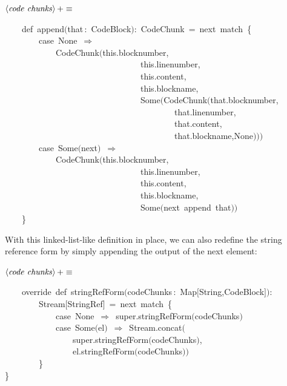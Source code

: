 \documentclass[a4paper,12pt]{article}
\begin{document}
$\left<\mbox{\emph{code chunks}}\right>+\equiv$
\begin{program}~~~~{\vem def}~append$($that\,{\rm :}~CodeBlock$)${\rm :}~CodeChunk~=~next~{\vem match}~{\small\{}
\\~~~~~~~~{\vem case}~None~$\Rightarrow$
\\~~~~~~~~~~~~CodeChunk$(${\vem this}.blocknumber,
\\~~~~~~~~~~~~~~~~~~~~~~~~~~~~~~~~{\vem this}.linenumber,
\\~~~~~~~~~~~~~~~~~~~~~~~~~~~~~~~~{\vem this}.content,
\\~~~~~~~~~~~~~~~~~~~~~~~~~~~~~~~~{\vem this}.blockname,
\\~~~~~~~~~~~~~~~~~~~~~~~~~~~~~~~~Some$($CodeChunk$($that.blocknumber,
\\~~~~~~~~~~~~~~~~~~~~~~~~~~~~~~~~~~~~~~~~that.linenumber,
\\~~~~~~~~~~~~~~~~~~~~~~~~~~~~~~~~~~~~~~~~that.content,
\\~~~~~~~~~~~~~~~~~~~~~~~~~~~~~~~~~~~~~~~~that.blockname,None$)$$)$$)$
\\~~~~~~~~{\vem case}~Some$($next$)$~$\Rightarrow$
\\~~~~~~~~~~~~CodeChunk$(${\vem this}.blocknumber,
\\~~~~~~~~~~~~~~~~~~~~~~~~~~~~~~~~{\vem this}.linenumber,
\\~~~~~~~~~~~~~~~~~~~~~~~~~~~~~~~~{\vem this}.content,
\\~~~~~~~~~~~~~~~~~~~~~~~~~~~~~~~~{\vem this}.blockname,
\\~~~~~~~~~~~~~~~~~~~~~~~~~~~~~~~~Some$($next~append~that$)$$)$
\\~~~~{\small\}}
\\[0.5em]\end{program}



With this linked-list-like definition in place, we can also redefine
the string reference form by simply appending the output of the next
element:

$\left<\mbox{\emph{code chunks}}\right>+\equiv$
\begin{program}~~~~{\vem override}~{\vem def}~stringRefForm$($codeChunks\,{\rm :}~Map$[$String,CodeBlock$]$$)${\rm :}
\\~~~~~~~~Stream$[$StringRef$]$~=~next~{\vem match}~{\small\{}
\\~~~~~~~~~~~~{\vem case}~None~$\Rightarrow$~{\vem super}.stringRefForm$($codeChunks$)$
\\~~~~~~~~~~~~{\vem case}~Some$($el$)$~$\Rightarrow$~Stream.concat$($
\\~~~~~~~~~~~~~~~~{\vem super}.stringRefForm$($codeChunks$)$,
\\~~~~~~~~~~~~~~~~el.stringRefForm$($codeChunks$)$$)$
\\~~~~~~~~{\small\}}
\\{\small\}}
\\[0.5em]\end{program}
\end{document}
